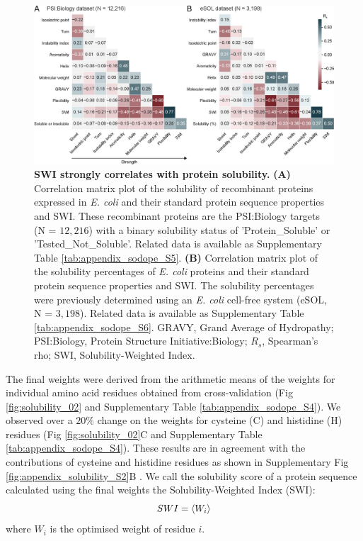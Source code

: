 \begin{figure}[!hbtp]
\centerline{\includegraphics[width=1\textwidth]{chapters/Solubility/Figures/fig3.eps}}
\caption[SWI strongly correlates with protein solubility.]{{\bf SWI strongly correlates with protein solubility.} {\bf (A)} Correlation matrix plot of the solubility of recombinant proteins expressed in {\it E. coli} and their standard protein sequence properties and SWI. These recombinant proteins are the PSI:Biology targets (N = $12,216$) with a binary solubility status of 'Protein\_Soluble’ or 'Tested\_Not\_Soluble’. Related data is available as Supplementary Table \ref{tab:appendix_sodope_S5}. {\bf (B)} Correlation matrix plot of the solubility percentages of {\it E. coli} proteins and their standard protein sequence properties and SWI. The solubility percentages were previously determined using an {\it E. coli} cell-free system (eSOL, N = $3,198$). Related data is available as Supplementary Table \ref{tab:appendix_sodope_S6}. GRAVY, Grand Average of Hydropathy; PSI:Biology, Protein Structure Initiative:Biology; $R_s$, Spearman’s rho; SWI, Solubility-Weighted Index.
}\label{fig:solubility_03}
\end{figure}


The final weights were derived from the arithmetic means of the weights for individual amino acid residues obtained from cross-validation (Fig \ref{fig:solubility_02} and Supplementary Table \ref{tab:appendix_sodope_S4}). We observed over a $20\%$ change on the weights for cysteine (C) and histidine (H) residues (Fig \ref{fig:solubility_02}C and Supplementary Table \ref{tab:appendix_sodope_S4}). These results are in agreement with the contributions of cysteine and histidine residues as shown in Supplementary Fig \ref{fig:appendix_solubility_S2}B . We call the solubility score of a protein sequence calculated using the final weights the Solubility-Weighted Index (SWI):
\begin{equation}
    SWI = \langle W_i \rangle
    \label{eqn:swi}\vspace*{-10pt}
\end{equation}
where $W_i$ is the optimised weight of residue $i$.


